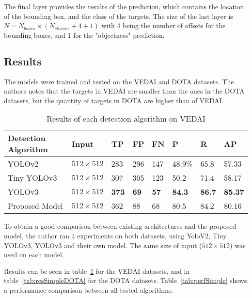 The final layer provides the results of the prediction, which contains the location of the bounding box, and the class of the targets. The size of the last layer is $N = N_{boxes} \times (N_{classes} + 4 + 1)$ with 4 being the number of offsets for the bounding boxes, and 1 for the  "objectness" prediction. 

\subsection{Results}
The models were trained and tested on the VEDAI\cite{vedai} and DOTA datasets\cite{dota}. The authors notes that the targets in VEDAI are smaller than the ones in the DOTA datasets, but the quantity of targets in DOTA are higher than of VEDAI.


\begin{table}[h!]
	\centering
	\begin{tabular}{@{}llllllll@{}}
		\toprule
		Detection Algorithm & Input            & TP  & FP  & FN  & P      & R    & AP    \\ \midrule
		YOLOv2              & $512 \times 512$ & 283 & 296 & 147 & 48.9\% & 65.8 & 57.33 \\
		Tiny YOLOv3         & $512 \times 512$ & 307 & 305 & 123 & 50.2   & 71.4 & 58.17 \\
		YOLOv3              & $512 \times 512$ & \textbf{373}& \textbf{69} & \textbf{57} & \textbf{84.3}  & \textbf{86.7}& \textbf{85.37}\\
		Proposed Model      & $512 \times 512$ & 362 & 88  & 68  & 80.5   & 84.2 & 80.16 \\ \bottomrule
	\end{tabular}
	\caption{Results of each detection algorithm on VEDAI }
	\label{tab:resSimpleVEDAI}
\end{table}
To obtain a good comparison between existing architectures and the proposed model, the author ran 4 experiments on both datasets, using YoloV2, Tiny YOLOv3, YOLOv3 and their own model. The same size of input ($512 \times 512$) was used on each model.

Results can be seen in table~\ref{tab:resSimpleVEDAI} for the VEDAI datasets, and in table~\ref{tab:resSimpleDOTA} for the DOTA datasets. Table~\ref{tab:perfSimple} shows a performance comparison between all tested algorithms.


